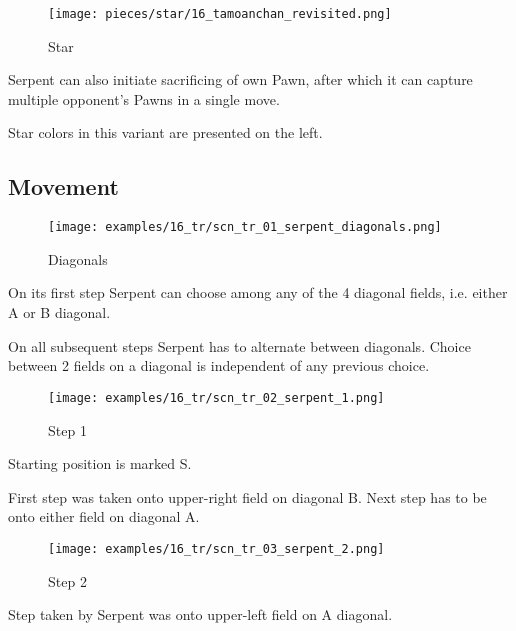 \noindent
\begin{wrapfigure}{l}{0.4\textwidth}
\centering
\texttt{[image: pieces/star/16\_tamoanchan\_revisited.png]}
\caption{Star}
\label{fig:star/16_tamoanchan_revisited}
\end{wrapfigure}
Serpent can also initiate sacrificing of own Pawn, after which it can capture
multiple opponent's Pawns in a single move.

Star colors in this variant are presented on the left.

\clearpage %

\subsection*{Movement}
\label{sec:Tamoanchan Revisited/Serpent/Movement}

\vspace*{-0.7\baselineskip}
\noindent
\begin{wrapfigure}[8]{l}{0.4\textwidth}
\centering
\texttt{[image: examples/16\_tr/scn\_tr\_01\_serpent\_diagonals.png]}
\vspace*{-0.4\baselineskip}
\caption{Diagonals}
\label{fig:scn_tr_01_serpent_diagonals}
\end{wrapfigure}
On its first step Serpent can choose among any of the 4 diagonal fields,
i.e. either A or B diagonal.

On all subsequent steps Serpent has to alternate between diagonals.
Choice between 2 fields on a diagonal is independent of any previous choice.

\vspace*{1.4\baselineskip}
\noindent
\begin{wrapfigure}[5]{l}{0.4\textwidth}
\centering
\texttt{[image: examples/16\_tr/scn\_tr\_02\_serpent\_1.png]}
\vspace*{-0.4\baselineskip}
\caption{Step 1}
\label{fig:scn_tr_02_serpent_1}
\end{wrapfigure}
Starting position is marked S.

First step was taken onto upper-right field on diagonal B.
Next step has to be onto either field on diagonal A.

\vspace*{4.4\baselineskip}
\noindent
\begin{wrapfigure}[9]{l}{0.4\textwidth} %
\centering
\texttt{[image: examples/16\_tr/scn\_tr\_03\_serpent\_2.png]}
\vspace*{-0.4\baselineskip}
\caption{Step 2}
\label{fig:scn_tr_03_serpent_2}
\end{wrapfigure}
Step taken by Serpent was onto upper-left field on A diagonal.

